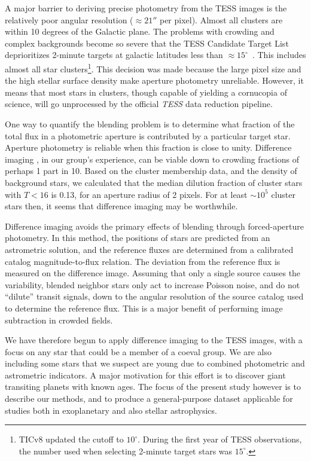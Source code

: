 \documentclass[12pt,twocolumn,tighten]{aastex62}
\begin{document}
A major barrier to deriving precise photometry from the TESS images is
the relatively poor angular resolution ($\approx 21''$ per pixel).
Almost all clusters are within 10 degrees of the Galactic plane. The
problems with crowding and complex backgrounds become so severe
that the TESS Candidate Target List deprioritizes
2-minute targets at galactic latitudes less than $\approx
15^\circ$~\citep{stassun_TIC_2018,stassun_TIC8_2019}. This includes
almost all star clusters\footnote{TICv8 updated the cutoff to
$10^\circ$. During the first year of TESS observations, the number
used when selecting 2-minute target stars was $15^\circ$.}.  This decision
was made because
the large pixel size and the high stellar surface density make
aperture photometry unreliable.  However, it means that most
stars in clusters, though capable of yielding a cornucopia of science,
will go unprocessed by the official {\it TESS} data reduction
pipeline.

One way to quantify the blending problem is to determine what fraction of
the total flux in a photometric aperture is contributed by a
particular target star. Aperture photometry is reliable when this
fraction is close to unity.  
Difference imaging \citep{Alard_Lupton_1998,miller_optimal_2008}, in
our group's experience, can be viable down to crowding fractions
of perhaps 1 part in 10.
Based on the
\citet{Kharchenko_et_al_2013} cluster membership data, and the density
of background stars, we calculated that the median dilution fraction of
cluster stars with $T< 16$ is 0.13, for an aperture radius of 2 pixels.
For at least $\sim$$10^5$ cluster stars then, it seems that difference
imaging may be worthwhile.

Difference imaging avoids the primary effects of blending through
forced-aperture photometry.  In this method,
the positions of stars are predicted from an astrometric
solution, and the reference fluxes are determined from a calibrated
catalog magnitude-to-flux relation.  The deviation from the reference
flux is measured on the difference image.  Assuming that only a single
source causes the variability, blended neighbor stars only act to
increase Poisson noise, and do not ``dilute'' transit signals, down to
the angular resolution of the source catalog used to determine the
reference flux.  This is a major benefit of performing image
subtraction in crowded fields.

We have therefore begun to apply difference imaging to the
TESS images, with a focus on any star that could be a member
of a coeval group.  We
are also including some stars that we suspect are young due to
combined photometric and astrometric indicators.
A major motivation for
this effort is to discover giant transiting planets with known ages.
The focus of the present study however is to describe our
methods, and to produce a general-purpose
dataset applicable for studies both in exoplanetary and also
stellar astrophysics.
\end{document}
